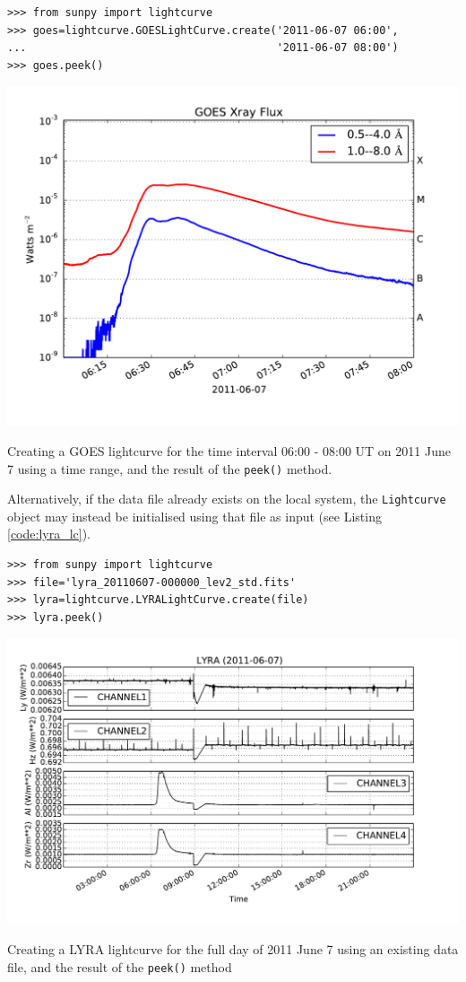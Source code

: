 \begin{listing}[H]
\begin{verbatim}
>>> from sunpy import lightcurve
>>> goes=lightcurve.GOESLightCurve.create('2011-06-07 06:00',
...                                       '2011-06-07 08:00')
>>> goes.peek()
\end{verbatim}
\includegraphics[width=14cm]{goes_lightcurve.pdf}
\caption{Creating a GOES lightcurve for the time interval 06:00 - 08:00 UT on 
2011 June 7 using a time range, and the result of the \texttt{peek()} method.}
\label{code:goes_lc}
\end{listing}

Alternatively, if the data file already exists on the local system,
the \texttt{Lightcurve} object may instead be initialised using that
file as input (see Listing \ref{code:lyra_lc}).

\begin{listing}[H]
\begin{verbatim}
>>> from sunpy import lightcurve
>>> file='lyra_20110607-000000_lev2_std.fits'
>>> lyra=lightcurve.LYRALightCurve.create(file)
>>> lyra.peek()
\end{verbatim}
\includegraphics[width=14cm]{lyra_lightcurve.pdf}
\caption{Creating a LYRA lightcurve for the full day of 2011 June 7 using an 
existing data file, and the result of the \texttt{peek()} method}
\label{code:lyra_lc}
\end{listing}

